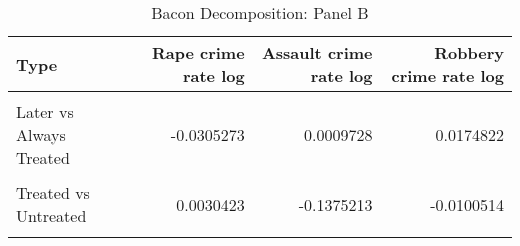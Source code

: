 \begin{table}[H]

\caption{\label{tab:tab:bacondecompositionb}Bacon Decomposition: Panel B}
\centering
\begin{tabular}[t]{lrrr}
\toprule
Type & Rape crime rate log & Assault crime rate log & Robbery crime rate log\\
\midrule
\cellcolor{gray!6}{Earlier vs Later Treated} & \cellcolor{gray!6}{-0.0026425} & \cellcolor{gray!6}{0.0079628} & \cellcolor{gray!6}{0.0073682}\\
Later vs Always Treated & -0.0305273 & 0.0009728 & 0.0174822\\
\cellcolor{gray!6}{Later vs Earlier Treated} & \cellcolor{gray!6}{-0.0019283} & \cellcolor{gray!6}{-0.0034427} & \cellcolor{gray!6}{0.0020947}\\
Treated vs Untreated & 0.0030423 & -0.1375213 & -0.0100514\\
\cellcolor{gray!6}{Total TWFE} & \cellcolor{gray!6}{-0.0320558} & \cellcolor{gray!6}{-0.1320284} & \cellcolor{gray!6}{0.0168936}\\
\bottomrule
\end{tabular}
\end{table}
